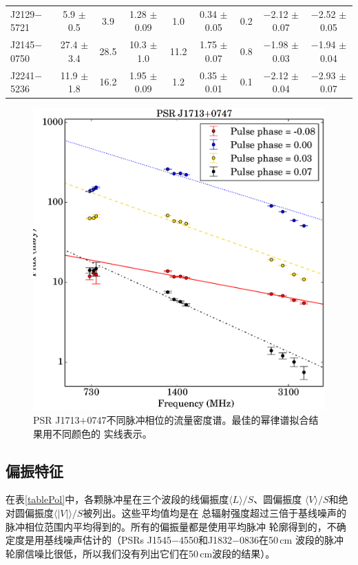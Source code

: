 \begin{landscape}
\begin{table}
\begin{tabular}{lcccccccc}
 J2129$-$5721  &  5.9   $\pm$ 0.5  &  3.9   &  1.28  $\pm$ 0.09 &  1.0  &  0.34 $\pm$ 0.05 &  0.2   &  $-$2.12 $\pm$ 0.07 &  $-$2.52 $\pm$ 0.05 \\ 
 J2145$-$0750  &  27.4  $\pm$ 3.4  &  28.5  &  10.3  $\pm$ 1.0  &  11.2 &  1.75 $\pm$ 0.07 &  0.8   &  $-$1.98 $\pm$ 0.03 &  $-$1.94 $\pm$ 0.04 \\ 
 J2241$-$5236  &  11.9  $\pm$ 1.8  &  16.2  &  1.95  $\pm$ 0.09 &  1.2  &  0.35 $\pm$ 0.01 &  0.1   &  $-$2.12 $\pm$ 0.04 &  $-$2.93 $\pm$ 0.07 \\ 
\hline
\end{tabular}
\end{table}
\end{landscape}

\begin{figure}
\begin{center}
\includegraphics[width=3 in]{1713phaseSI.ps}
\caption{PSR J1713$+$0747不同脉冲相位的流量密度谱。最佳的幂律谱拟合结果用不同颜色的
实线表示。} 
\label{1713SI}
\end{center}
\end{figure}

\subsection{偏振特征}

在表\ref{tablePol}中，各颗脉冲星在三个波段的线偏振度$\langle L \rangle/S$、圆偏振度
$\langle V \rangle/S$和绝对圆偏振度$\langle|V|\rangle/S$被列出。这些平均值均是在
总辐射强度超过三倍于基线噪声的脉冲相位范围内平均得到的。所有的偏振量都是使用平均脉冲
轮廓得到的，不确定度是用基线噪声估计的（PSRs J1545$-$4550和J1832$-$0836在50\,cm
波段的脉冲轮廓信噪比很低，所以我们没有列出它们在50\,cm波段的结果）。

